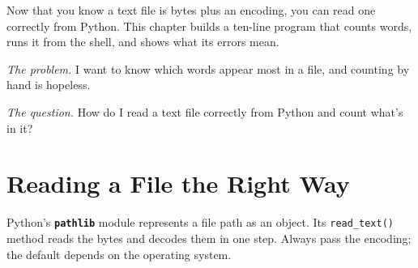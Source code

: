 
\begin{chapterintro}

Now that you know a text file is bytes plus an encoding, you can read one correctly from Python. This chapter builds a ten-line program that counts words, runs it from the shell, and shows what its errors mean.

\end{chapterintro}

\emph{The problem.} I want to know which words appear most in a file, and counting by hand is hopeless.

\emph{The question.} How do I read a text file correctly from Python and count what's in it?

\section{Reading a File the Right Way}\label{02-counting-words-with-python:reading-a-file-the-right-way}

Python's \textbf{\texttt{pathlib}} module represents a file path as an object. Its \texttt{read\_text()} method reads the bytes and decodes them in one step. Always pass the encoding; the default depends on the operating system.

\begin{codeblock}

\begin{Shaded}
\begin{Highlighting}[]


\OperatorTok{{-}\textgreater{}}
\OperatorTok{=}\OperatorTok{=}\NormalTok{)}


  \OperatorTok{==} \NormalTok{:}
\OperatorTok{=}\NormalTok{ count\_words(Path(sys.argv[}\NormalTok{]))}
    \NormalTok{):}
        \NormalTok{(}\SpecialCharTok{\{}\SpecialStringTok{ }\SpecialCharTok{\{}\SpecialCharTok{\}}\NormalTok{)}
\end{Highlighting}
\end{Shaded}

\end{codeblock}

